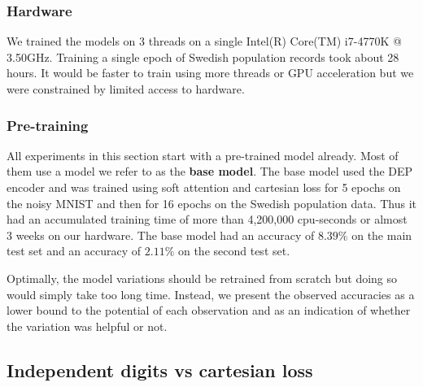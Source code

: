 \subsubsection{Hardware}
We trained the models on 3 threads on a single Intel(R) Core(TM) i7-4770K @ 3.50GHz. Training a single epoch of Swedish population records took about 28 hours. It would be faster to train using more threads or GPU acceleration but we were constrained by limited access to hardware.


\subsubsection{Pre-training}

All experiments in this section start with a pre-trained model already. Most of them use a model we refer to as the \textbf{base model}. The base model used the DEP encoder and was trained using soft attention and cartesian loss for 5 epochs on the noisy MNIST and then for 16 epochs on the Swedish population data. Thus it had an accumulated training time of more than 4,200,000 cpu-seconds or almost 3 weeks on our hardware.
The base model had an accuracy of $8.39\%$ on the main test set and an accuracy of $2.11\%$ on the second test set.

Optimally, the model variations should be retrained from scratch but doing so would simply take too long time.
Instead, we present the observed accuracies as a lower bound to the potential of each observation and as an indication of whether the variation was helpful or not.




\subsection{Independent digits vs cartesian loss} \label{sssec:ind_digits}

